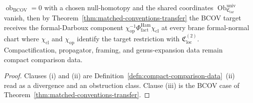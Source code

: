 \begin{thm}
\begin{enumerate}[label=(\roman*)]
      \(\operatorname{ob}_{\mathrm{BCOV}}=0\) with a chosen
      null-homotopy and the shared coordinates
      \(\operatorname{Ob}_{\mathfrak C_{\mathrm{tar}}}^{\mathrm{univ}}\)
      vanish, then by Theorem~\ref{thm:matched-conventions-transfer}
	      the BCOV target receives the formal-Darboux component
	      \(\chi_{\mathrm{op}}^{-1}\Phi^{\mathrm{Ham}}_{\mathrm{fact}}
	      \chi_{\mathrm{cl}}\) at every brane formal-normal chart where
	      \(\chi_{\mathrm{cl}}\) and \(\chi_{\mathrm{op}}\) identify the
	      target restriction with \(\mathfrak C_{\mathrm{loc}}^{(2)}\).
      Compactification, propagator, framing, and genus-expansion data
	      remain compact comparison data.
  \end{enumerate}
\end{thm}

\begin{proof}
  Clauses (i) and (ii) are
  Definition~\ref{defn:compact-comparison-data}~(ii) read as a
  divergence and an obstruction class.  Clause (iii) is the BCOV
  case of Theorem~\ref{thm:matched-conventions-transfer}.
\end{proof}

